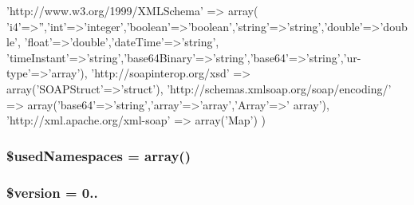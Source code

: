 \begin{DoxyCode}
    \textcolor{stringliteral}{'http://www.w3.org/1999/XMLSchema'} => array(
        \textcolor{stringliteral}{'i4'}=>\textcolor{stringliteral}{''},\textcolor{stringliteral}{'int'}=>\textcolor{stringliteral}{'integer'},\textcolor{stringliteral}{'boolean'}=>\textcolor{stringliteral}{'boolean'},\textcolor{stringliteral}{'string'}=>\textcolor{stringliteral}{'string'},\textcolor{stringliteral}{'double'}=>\textcolor{stringliteral}{'double'},
        \textcolor{stringliteral}{'float'}=>\textcolor{stringliteral}{'double'},\textcolor{stringliteral}{'dateTime'}=>\textcolor{stringliteral}{'string'},
        \textcolor{stringliteral}{'timeInstant'}=>\textcolor{stringliteral}{'string'},\textcolor{stringliteral}{'base64Binary'}=>\textcolor{stringliteral}{'string'},\textcolor{stringliteral}{'base64'}=>\textcolor{stringliteral}{'string'},\textcolor{stringliteral}{'ur-type'}=>\textcolor{stringliteral}{'array'}),
    \textcolor{stringliteral}{'http://soapinterop.org/xsd'} => array(\textcolor{stringliteral}{'SOAPStruct'}=>\textcolor{stringliteral}{'struct'}),
    \textcolor{stringliteral}{'http://schemas.xmlsoap.org/soap/encoding/'} => array(\textcolor{stringliteral}{'base64'}=>\textcolor{stringliteral}{'string'},\textcolor{stringliteral}{'array'}=>\textcolor{stringliteral}{'array'},\textcolor{stringliteral}{'Array'}=>\textcolor{stringliteral}{'
      array'}),
    \textcolor{stringliteral}{'http://xml.apache.org/xml-soap'} => array(\textcolor{stringliteral}{'Map'})
    )
\end{DoxyCode}
\hypertarget{classnusoap__base_a2bd7e321e4132fe338d8502a5594aebc}{}
\subsubsection[{\$used\+Namespaces}]{\setlength{\rightskip}{0pt plus 5cm}\$used\+Namespaces = array()}\label{classnusoap__base_a2bd7e321e4132fe338d8502a5594aebc}
\hypertarget{classnusoap__base_a17c8948c68aa44fa9961ae169b6a8961}{}
\subsubsection[{\$version}]{\setlength{\rightskip}{0pt plus 5cm}\$version = \textquotesingle{}0..\textquotesingle{}}\label{classnusoap__base_a17c8948c68aa44fa9961ae169b6a8961}
\hypertarget{classnusoap__base_a912a5d3348012e245bb16e2cab11d4cc}{}
